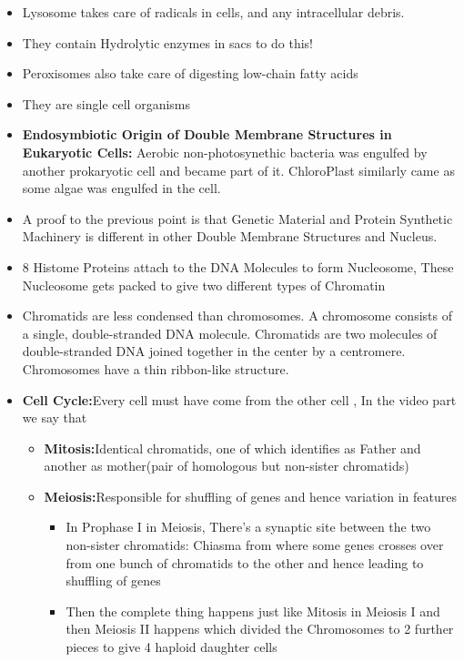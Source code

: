\documentclass{article}
\begin{document}
\begin{itemize}
    \item Lysosome takes care of radicals in cells, and any intracellular debris.
    \item They contain Hydrolytic enzymes in sacs to do this!
    \item Peroxisomes also take care of digesting low-chain fatty acids
    \item They are single cell organisms
    \item \textbf{Endosymbiotic Origin of Double Membrane Structures in Eukaryotic Cells:} Aerobic non-photosynethic bacteria was engulfed by another prokaryotic cell and became part of it. ChloroPlast similarly came as some algae was engulfed in the cell.
    \item A proof to the previous point is that Genetic Material and Protein Synthetic Machinery is different in other Double Membrane Structures and Nucleus.
    \item 8 Histome Proteins attach to the DNA Molecules to form Nucleosome, These Nucleosome gets packed to give two different types of Chromatin
    \item Chromatids are less condensed than chromosomes. A chromosome consists of a single, double-stranded DNA molecule. Chromatids are two molecules of double-stranded DNA joined together in the center by a centromere. Chromosomes have a thin ribbon-like structure.

    \item \textbf{Cell Cycle:}Every cell must have come from the other cell , In the video part we say that
    \begin{itemize}
        \item \textbf{Mitosis:}Identical chromatids, one of which identifies as Father and another as mother(pair of homologous but non-sister chromatids)
        \item \textbf{Meiosis:}Responsible for shuffling of genes and hence variation in features
        \begin{itemize}
            \item In Prophase I in Meiosis, There's a synaptic site between the two non-sister chromatids: Chiasma from where some genes crosses over from one bunch of chromatids to the other and hence leading to shuffling of genes
            \item Then the complete thing happens just like Mitosis in Meiosis I and then Meiosis II happens which divided the Chromosomes to 2 further pieces to give 4 haploid daughter cells


\end{itemize}
\end{itemize}
\end{itemize}
\end{document}
